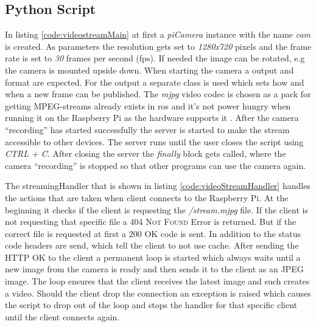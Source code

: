 \subsection{Python Script}\label{ref:streamPythonScript}
In listing \ref{code:videostreamMain} at first a \textit{piCamera} instance with the name \textit{cam} is created. As parameters the resolution gets set to \textit{1280x720} pixels and the frame rate is set to \textit{30} frames per second (\gls{fps}). If needed the image can be rotated, e.g the camera is mounted upside down. When starting the camera a output and format are expected. For the output a separate class is used which sets how and when a new frame can be published. The \textit{mjpg} video codec is chosen as a pack for getting MPEG-streams already exists in \gls{ros} and it's not power hungry when running it on the Raspberry Pi as the hardware supports it \cite{raspberrypi3bplusspecs}. \newline
After the camera \enquote{recording} has started successfully the server is started to make the stream accessible to other devices. The server runs until the user closes the script using \textit{CTRL + C}. After closing the server the \textit{finally} block gets called, where the camera \enquote{recording} is stopped so that other programs can use the camera again.\newline


The streamingHandler that is shown in listing \ref{code:videoStreamHandler} handles the actions that are taken when client connects to the Raspberry Pi. At the beginning it checks if the client is requesting the \textit{/stream.mjpg} file. If the client is not requesting that specific file a \textsc{404 Not Found} Error is returned. But if the correct file is requested at first a \textsc{200 OK} code is sent. In addition to the status code headers are send, which tell the client to not use cache. After sending the \textsc{HTTP OK} to the client a permanent loop is started which always waits until a new image from the camera is ready and then sends it to the client as an JPEG image. The loop ensures that the client receives the latest image and such creates a video. Should the client drop the connection an exception is raised which causes the script to drop out of the loop and stops the handler for that specific client until the client connects again.\newline


